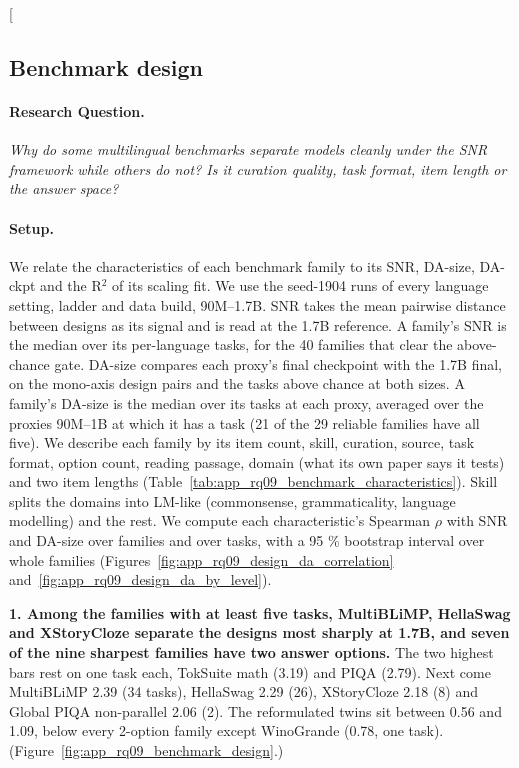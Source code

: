 \clearpage
\twocolumn[{%
\rqparent
\subsection{Benchmark design}
\label{app:rq09_benchmark_design}

\noindent\begin{minipage}[t]{0.485\textwidth}
\vspace{0pt}
\paragraph{Research Question.} \emph{Why do some multilingual benchmarks separate models cleanly under the SNR framework while others do not? Is it curation quality, task format, item length or the answer space?}

\paragraph{Setup.} We relate the characteristics of each benchmark family to its SNR, DA-size, DA-ckpt and the R$^2$ of its scaling fit. We use the seed-1904 runs of every language setting, ladder and data build, 90M--1.7B. SNR takes the mean pairwise distance between designs as its signal and is read at the 1.7B reference. A family's SNR is the median over its per-language tasks, for the 40 families that clear the above-chance gate. DA-size compares each proxy's final checkpoint with the 1.7B final, on the mono-axis design pairs and the tasks above chance at both sizes. A family's DA-size is the median over its tasks at each proxy, averaged over the proxies 90M--1B at which it has a task (21 of the 29 reliable families have all five). We describe each family by its item count, skill, curation, source, task format, option count, reading passage, domain (what its own paper says it tests) and two item lengths (Table~\ref{tab:app_rq09_benchmark_characteristics}). Skill splits the domains into LM-like (commonsense, grammaticality, language modelling) and the rest. We compute each characteristic's Spearman $\rho$ with SNR and DA-size over families and over tasks, with a 95 \% bootstrap interval over whole families (Figures~\ref{fig:app_rq09_design_da_correlation} and~\ref{fig:app_rq09_design_da_by_level}).
\end{minipage}\hfill
\begin{minipage}[t]{0.485\textwidth}
\vspace{0pt}
\begin{rqfinding}
\textbf{1. Among the families with at least five tasks, MultiBLiMP, HellaSwag and XStoryCloze separate the designs most sharply at 1.7B, and seven of the nine sharpest families have two answer options.} The two highest bars rest on one task each, TokSuite math (3.19) and PIQA (2.79). Next come MultiBLiMP 2.39 (34 tasks), HellaSwag 2.29 (26), XStoryCloze 2.18 (8) and Global PIQA non-parallel 2.06 (2). The reformulated twins sit between 0.56 and 1.09, below every 2-option family except WinoGrande (0.78, one task). (Figure~\ref{fig:app_rq09_benchmark_design}.)

\end{rqfinding}
\end{minipage}}
